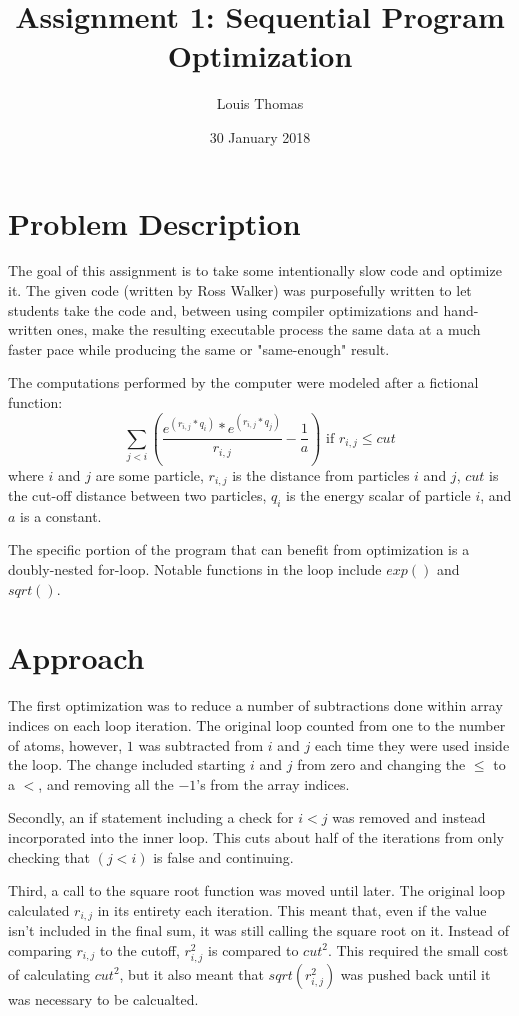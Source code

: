 \documentclass[12pt]{article}
\title{Assignment 1: Sequential Program Optimization}
\author{Louis Thomas}
\date{30 January 2018}
\begin{document}
	\maketitle
	\section{Problem Description}
	The goal of this assignment is to take some intentionally slow code and optimize it.
	The given code (written by Ross Walker) was purposefully written to let students take the code 
	and, between using compiler optimizations and hand-written ones, 
	make the resulting executable process the same data at a much faster pace 
	while producing the same or "same-enough" result.

	The computations performed by the computer were modeled after a fictional function: 
	\[ \displaystyle\sum_{j<i}\left(
			\frac{e^{(r_{i,j}*q_i)}*e^{(r_{i,j}*q_j)}}{r_{i,j}}
			-\frac{1}{a}
			\right) \text{ if } r_{i,j} \leq cut\]
	where $i$ and $j$ are some particle,
	$r_{i,j}$ is the distance from particles $i$ and $j$,
	$cut$ is the cut-off distance between two particles,
	$q_{i}$ is the energy scalar of particle $i$, and
	$a$ is a constant.

	The specific portion of the program that can benefit from optimization is a doubly-nested for-loop. Notable functions in the loop include $exp()$ and $sqrt()$.

	\section{Approach}

	The first optimization was to reduce a number of subtractions done within array indices on each loop iteration.
	The original loop counted from one to the number of atoms,
	however, $1$ was subtracted from $i$ and $j$ each time they were used inside the loop.
	The change included starting $i$ and $j$ from zero and changing the $\leq$ to a $<$, and removing all the $-1$'s from the array indices.

	Secondly, an if statement including a check for $i<j$ was removed and instead incorporated into the inner loop.
	This cuts about half of the iterations from only checking that $(j<i)$ is false and continuing.

	Third, a call to the square root function was moved until later.
	The original loop calculated $r_{i,j}$ in its entirety each iteration.
	This meant that, even if the value isn't included in the final sum, it was still calling the square root on it.
	Instead of comparing $r_{i,j}$ to the cutoff, $r_{i,j}^2$ is compared to $cut^2$.
	This required the small cost of calculating $cut^2$,
	but it also meant that $sqrt(r_{i,j}^2)$ was pushed back until it was necessary to be calcualted.
\end{document}
